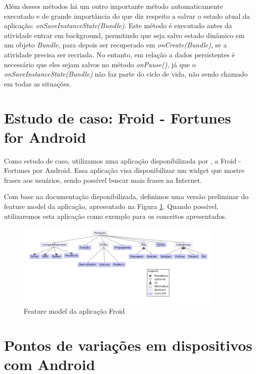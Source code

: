 Além desses métodos há um outro importante método automaticamente executado e de 
grande importância do que diz respeito a salvar o estado atual da aplicação: 
{\it onSaveInstanceState(Bundle)}. Este método é executado antes da atividade entrar em 
background, permitindo que seja salvo estado dinâmico em um objeto {\it Bundle}, para depois 
ser recuperado em {\it onCreate(Bundle)}, se a atividade precisa ser recriada. No entanto,
em relação a dados persistentes é necessário que eles sejam salvos no método {\it onPause()}, 
já que o {\it onSaveInstanceState(Bundle)} não faz parte do ciclo de vida, não sendo chamado 
em todas as situações.

\section{Estudo de caso: Froid - Fortunes for Android}

Como estudo de caso, utilizamos uma aplicação disponibilizada por \cite{abp}, a 
Froid - Fortunes por Android. Essa aplicação visa disponibilizar um widget que 
mostre frases aos usuários, sendo possível buscar mais frases na Internet. 

Com base na documentação disponibilizada, definimos uma versão preliminar do feature 
model da aplicação, apresentado na Figura \ref{fortunes_fm}. Quando possível, utilizaremos
esta aplicação como exemplo para os conceitos apresentados.

\begin{figure}[h]
    \centering
    \includegraphics[width=10cm]{img/fortunes_fm}
    \caption{Feature model da aplicação Froid}
    \label{fortunes_fm}
\end{figure}

\section{Pontos de variações em dispositivos com Android}

